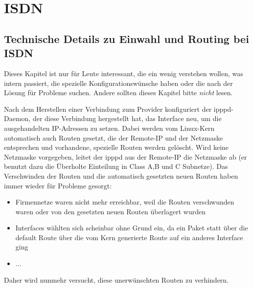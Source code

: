 \section{ISDN}
{
  \subsection{Technische Details zu Einwahl und Routing bei ISDN}
}

Dieses Kapitel ist nur für Leute interessant, die ein wenig verstehen
wollen, was intern passiert, die spezielle Konfigurationswünsche haben
oder die nach der Lösung für Probleme suchen. Andere sollten dieses
Kapitel bitte \emph{ nicht} lesen.

Nach dem Herstellen einer Verbindung zum Provider konfiguriert der
ipppd-Daemon, der diese Verbindung hergestellt hat, das Interface neu,
um die ausgehandelten IP-Adressen zu setzen. Dabei werden vom
Linux-Kern automatisch auch Routen gesetzt, die der Remote-IP und der
Netzmaske entsprechen und vorhandene, spezielle Routen werden
gelöscht. Wird keine Netzmaske vorgegeben, leitet der ipppd aus der
Remote-IP die Netzmaske ab (er benutzt dazu die Überholte Einteilung
in Class A,B und C Subnetze). Das Verschwinden der Routen und die
automatisch gesetzten neuen Routen haben immer wieder für Probleme
gesorgt:
\begin{itemize}
\item Firmennetze waren nicht mehr erreichbar, weil die Routen
  verschwunden waren oder von den gesetzten neuen Routen überlagert
  wurden
\item Interfaces wählten sich scheinbar ohne Grund ein, da ein Paket
  statt über die default Route über die vom Kern generierte Route auf
  ein anderes Interface ging
\item ...
\end{itemize}

Daher wird nunmehr versucht, diese unerwünschten Routen zu verhindern.


